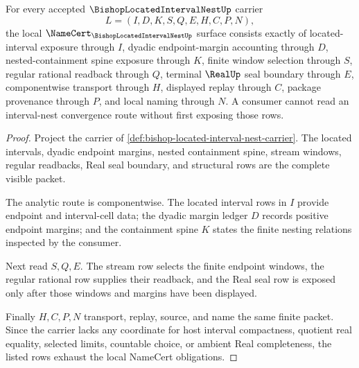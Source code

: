 \begin{theorem}
\label{thm:bishop-located-interval-nest-namecert-obligations}
For every accepted $\BishopLocatedIntervalNestUp$ carrier
$$
L=(I,D,K,S,Q,E,H,C,P,N),
$$
the local $\NameCert_{\BishopLocatedIntervalNestUp}$ surface consists exactly of located-interval exposure through $I$, dyadic endpoint-margin accounting through $D$, nested-containment spine exposure through $K$, finite window selection through $S$, regular rational readback through $Q$, terminal $\RealUp$ seal boundary through $E$, componentwise transport through $H$, displayed replay through $C$, package provenance through $P$, and local naming through $N$. A consumer cannot read an interval-nest convergence route without first exposing those rows.
\end{theorem}
\begin{proof}
Project the carrier of \autoref{def:bishop-located-interval-nest-carrier}. The located intervals, dyadic endpoint margins, nested containment spine, stream windows, regular readbacks, Real seal boundary, and structural rows are the complete visible packet.

The analytic route is componentwise. The located interval rows in $I$ provide endpoint and interval-cell data; the dyadic margin ledger $D$ records positive endpoint margins; and the containment spine $K$ states the finite nesting relations inspected by the consumer.

Next read $S,Q,E$. The stream row selects the finite endpoint windows, the regular rational row supplies their readback, and the Real seal row is exposed only after those windows and margins have been displayed.

Finally $H,C,P,N$ transport, replay, source, and name the same finite packet. Since the carrier lacks any coordinate for host interval compactness, quotient real equality, selected limits, countable choice, or ambient Real completeness, the listed rows exhaust the local NameCert obligations.
\end{proof}

